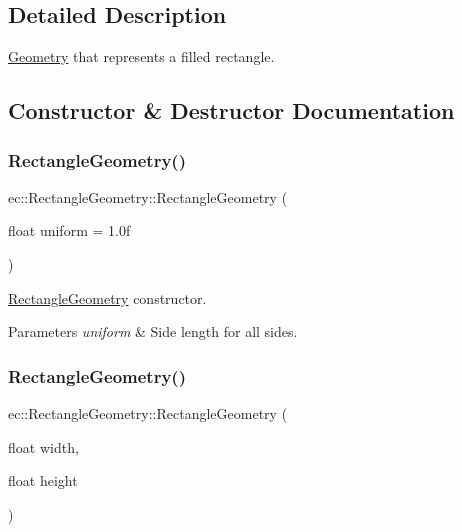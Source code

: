 \subsection{Detailed Description}
\mbox{\hyperlink{classec_1_1_geometry}{Geometry}} that represents a filled rectangle. 

\subsection{Constructor \& Destructor Documentation}
\mbox{\label{classec_1_1_rectangle_geometry_a32727c2f9bca52cec764627b9a5c27ec}} 
\subsubsection{\texorpdfstring{Rectangle\+Geometry()}{RectangleGeometry()}\hspace{0.1cm}{\footnotesize\ttfamily [1/2]}}
{\footnotesize\ttfamily ec\+::\+Rectangle\+Geometry\+::\+Rectangle\+Geometry (\begin{DoxyParamCaption}\item[{float}]{uniform = {\ttfamily 1.0f} }\end{DoxyParamCaption})\hspace{0.3cm}{\ttfamily [explicit]}}



\mbox{\hyperlink{classec_1_1_rectangle_geometry}{Rectangle\+Geometry}} constructor. 


\begin{DoxyParams}{Parameters}
{\em uniform} & Side length for all sides. \\
\hline
\end{DoxyParams}
\mbox{\label{classec_1_1_rectangle_geometry_aa1b327fbb455fe591c75b035882695cf}} 
\subsubsection{\texorpdfstring{Rectangle\+Geometry()}{RectangleGeometry()}\hspace{0.1cm}{\footnotesize\ttfamily [2/2]}}
{\footnotesize\ttfamily ec\+::\+Rectangle\+Geometry\+::\+Rectangle\+Geometry (\begin{DoxyParamCaption}\item[{float}]{width,  }\item[{float}]{height }\end{DoxyParamCaption})\hspace{0.3cm}{\ttfamily [explicit]}}



